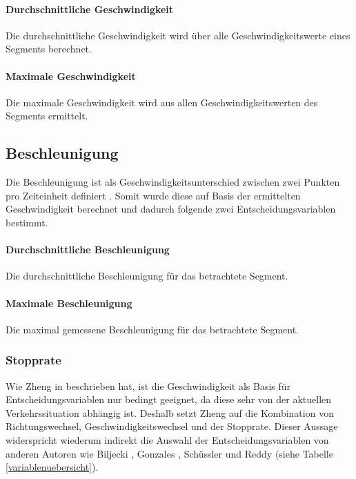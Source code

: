 \paragraph{Durchschnittliche Geschwindigkeit} Die durchschnittliche Geschwindigkeit wird über alle Geschwindigkeitswerte eines Segments berechnet.

\paragraph{Maximale Geschwindigkeit} Die maximale Geschwindigkeit wird aus allen Geschwindigkeitswerten des Segments ermittelt.

\subsection{Beschleunigung}
Die Beschleunigung ist als Geschwindigkeitsunterschied zwischen zwei Punkten pro Zeiteinheit definiert \cite[S.~51]{douglas_giancoli_physik_2010}. Somit wurde diese auf Basis der ermittelten Geschwindigkeit berechnet und dadurch folgende zwei Entscheidungsvariablen bestimmt.

\paragraph{Durchschnittliche Beschleunigung} Die durchschnittliche Beschleunigung für das betrachtete Segment. 

\paragraph{Maximale Beschleunigung} Die maximal gemessene Beschleunigung für das betrachtete Segment.

\subsubsection{Stopprate}
\label{stopprate}
Wie Zheng in \cite{zheng_understanding_2010} beschrieben hat, ist die Geschwindigkeit als Basis für Entscheidungsvariablen nur bedingt geeignet, da diese sehr von der aktuellen Verkehrssituation abhängig ist. Deshalb setzt Zheng auf die Kombination von Richtungswechsel, Geschwindigkeitswechsel und der Stopprate. Dieser Aussage widerspricht wiederum indirekt die Auswahl der Entscheidungsvariablen von anderen Autoren wie Biljecki  \cite{biljecki_transportation_2013}, Gonzales \cite{gonzalez_automating_2010}, Schüssler \cite{nadine_schussler_improving_2011} und Reddy \cite{reddy_using_2010} (siehe Tabelle \ref{variablenuebersicht}). 

